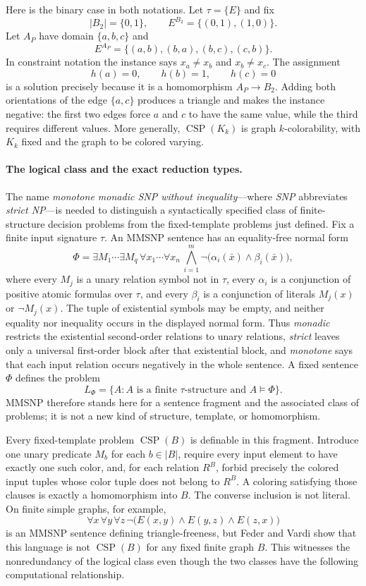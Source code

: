 Here is the binary case in both notations.  Let \(\tau=\{E\}\) and fix
\[
 \lvert B_2\rvert=\{0,1\},
 \qquad
 E^{B_2}=\{(0,1),(1,0)\}.
\]
Let \(A_P\) have domain \(\{a,b,c\}\) and
\[
 E^{A_P}=\{(a,b),(b,a),(b,c),(c,b)\}.
\]
In constraint notation the instance says
\(x_a\ne x_b\) and \(x_b\ne x_c\).  The assignment
\[
 h(a)=0,\qquad h(b)=1,\qquad h(c)=0
\]
is a solution precisely because it is a homomorphism \(A_P\to B_2\).  Adding
both orientations of the edge \(\{a,c\}\) produces a triangle and makes the
instance negative: the first two edges force \(a\) and \(c\) to have the same
value, while the third requires different values.  More generally,
\(\operatorname{CSP}(K_k)\) is graph \(k\)-colorability, with \(K_k\) fixed
and the graph to be colored varying.

\paragraph{The logical class and the exact reduction types.}
The name \emph{monotone monadic SNP without inequality}---where \emph{SNP}
abbreviates \emph{strict NP}---is needed to distinguish a syntactically
specified class of finite-structure decision problems from the fixed-template
problems just defined.  Fix a finite input signature \(\tau\).  An MMSNP
sentence has an equality-free normal form
\[
 \Phi=
 \exists M_1\cdots\exists M_q\,
 \forall x_1\cdots\forall x_n\,
 \bigwedge_{i=1}^{m}
   \neg\bigl(\alpha_i(\bar x)\land\beta_i(\bar x)\bigr),
\]
where every \(M_j\) is a unary relation symbol not in \(\tau\), every
\(\alpha_i\) is a conjunction of positive atomic formulas over \(\tau\), and
every \(\beta_i\) is a conjunction of literals \(M_j(x)\) or
\(\neg M_j(x)\).  The tuple of existential symbols may be empty, and neither
equality nor inequality occurs in the displayed normal form.  Thus
\emph{monadic} restricts the existential second-order relations to unary
relations, \emph{strict} leaves only a universal first-order block after that
existential block, and \emph{monotone} says that each input relation occurs
negatively in the whole sentence.  A fixed sentence \(\Phi\) defines the
problem
\[
 L_\Phi=\{A:A\text{ is a finite }\tau\text{-structure and }A\models\Phi\}.
\]
MMSNP therefore stands here for a sentence fragment and the associated class
of problems; it is not a new kind of structure, template, or homomorphism.

Every fixed-template problem \(\operatorname{CSP}(B)\) is definable in this
fragment.  Introduce one unary predicate \(M_b\) for each
\(b\in\lvert B\rvert\), require every input element to have exactly one such
color, and, for each relation \(R^B\), forbid precisely the colored input tuples
whose color tuple does not belong to \(R^B\).  A coloring satisfying those
clauses is exactly a homomorphism into \(B\).  The converse inclusion is not
literal.  On finite simple graphs, for example,
\[
 \forall x\,\forall y\,\forall z\,
 \neg\bigl(E(x,y)\land E(y,z)\land E(z,x)\bigr)
\]
is an MMSNP sentence defining triangle-freeness, but Feder and Vardi show that
this language is not \(\operatorname{CSP}(B)\) for any fixed finite graph
\(B\).  This witnesses the nonredundancy of the logical class even though the
two classes have the following computational relationship.

